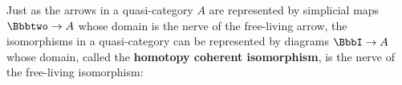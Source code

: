 



  Just as the arrows in a quasi-category $A$ are represented by simplicial maps $ \cattwo \to A$ whose domain is the nerve of the free-living arrow, the isomorphisms in a quasi-category can be  represented by diagrams $\iso \to A$ whose domain, called the \textbf{homotopy coherent isomorphism}, is the nerve of the free-living isomorphism:


